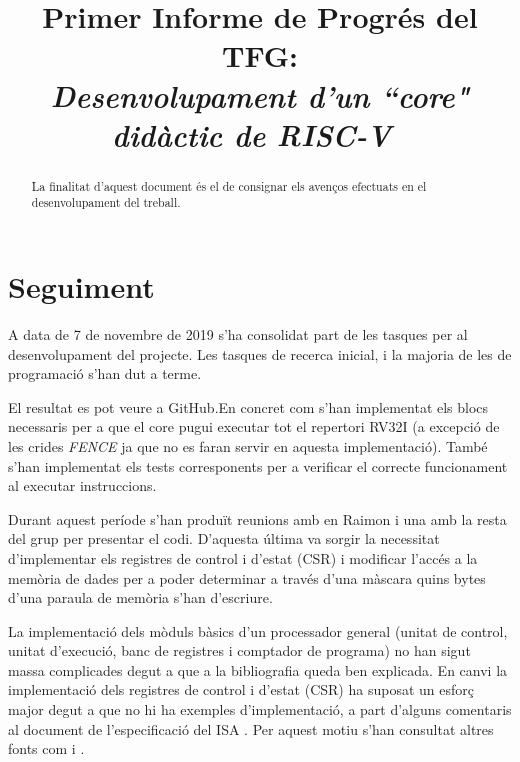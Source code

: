 \documentclass[conference,onecolumn, catalan]{IEEEtran}
\title{Primer Informe de Progrés del TFG: \\ \vspace{0.2cm} {\huge \textit{ Desenvolupament d'un ``core" didàctic de RISC-V\ }} }
\author{
\IEEEauthorblockN{Pau Casacuberta Orta}
\IEEEauthorblockA{
\textit{Autonomous University of Barcelona}\\
Cerdanyola del Vallès, Barcelona 08193\\
pau.casacubertao@e-campus.uab.cat\\}}
\begin{document}
\maketitle

\begin{versionhistory}
\end{versionhistory}


\begin{abstract}
La finalitat d'aquest document és el de consignar els avenços efectuats en el desenvolupament del treball.
\end{abstract}

\section{Seguiment}

A data de 7 de novembre de 2019 s'ha consolidat part de les tasques per al desenvolupament del projecte. 
Les tasques de recerca inicial, i la majoria de les de programació s'han dut a terme. 

El resultat es pot veure a GitHub\cite{casacuberta_orta_4a1c0/rv32i-verilog_2019}.En concret com s'han implementat els blocs necessaris per a que el core pugui executar tot el repertori RV32I (a excepció de les crides \textit{FENCE} ja que no es faran servir en aquesta implementació). 
També s'han implementat els tests corresponents per a verificar el correcte funcionament al executar instruccions.

Durant aquest període s'han produït reunions amb en Raimon i una amb la resta del grup per presentar el codi. D'aquesta última va sorgir la necessitat d'implementar els registres de control i d'estat (CSR) i modificar l'accés a la memòria de dades per a poder determinar a través d'una màscara quins bytes d'una paraula de memòria s'han d'escriure.

La implementació dels mòduls bàsics d'un processador general (unitat de control, unitat d'execució, banc de registres i comptador de programa) no han sigut massa complicades degut a que a la bibliografia \cite{patterson_computer_2018} queda ben explicada. En canvi la implementació dels registres de control i d'estat (CSR) ha suposat un esforç major degut a que no hi ha exemples d'implementació, a part d'alguns comentaris al document de l'especificació del ISA \cite{waterman_volume_2019}. Per aquest motiu s'han consultat altres fonts com \cite{noauthor_fe310g:_2017} i \cite{noauthor_control_nodate}.
\end{document}
